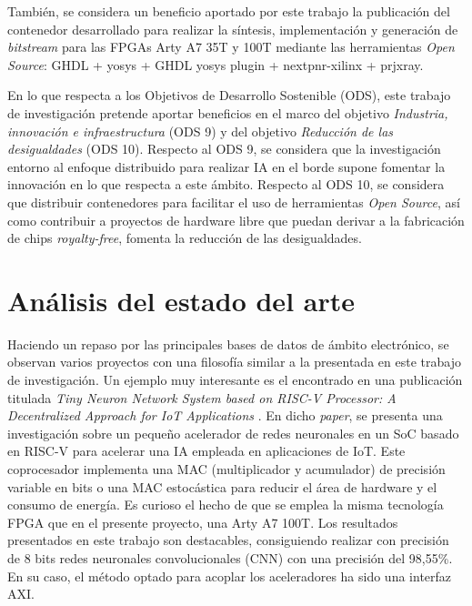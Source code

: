 También, se considera un beneficio aportado por este trabajo la publicación del contenedor \cite{gh:conatiner-implarty} desarrollado para realizar la síntesis, implementación y generación de \textit{bitstream} para las FPGAs Arty A7 35T y 100T mediante las herramientas \textit{Open Source}: GHDL + yosys + GHDL yosys plugin + nextpnr-xilinx + prjxray.

En lo que respecta a los Objetivos de Desarrollo Sostenible (ODS), este trabajo de investigación pretende aportar beneficios en el marco del objetivo \textit{Industria, innovación e infraestructura} (ODS 9) y del objetivo \textit{Reducción de las desigualdades} (ODS 10). 
Respecto al ODS 9, se considera que la investigación entorno al enfoque distribuido para realizar IA en el borde supone fomentar la innovación en lo que respecta a este ámbito.
Respecto al ODS 10, se considera que distribuir contenedores para facilitar el uso de herramientas \textit{Open Source}, así como contribuir a proyectos de hardware libre que puedan derivar a la fabricación de chips \textit{royalty-free}, fomenta la reducción de las desigualdades.

\section{Análisis del estado del arte}

Haciendo un repaso por las principales bases de datos de ámbito electrónico, se observan varios proyectos con una filosofía similar a la presentada en este trabajo de investigación.
Un ejemplo muy interesante es el encontrado en una publicación titulada \textit{Tiny Neuron Network System based on RISC-V Processor: A Decentralized Approach for IoT Applications} \cite{9942990}.
En dicho \textit{paper}, se presenta una investigación sobre un pequeño acelerador de redes neuronales en un SoC basado en RISC-V para acelerar una IA empleada en aplicaciones de IoT. 
Este coprocesador implementa una MAC (multiplicador y acumulador) de precisión variable en bits o una MAC estocástica para reducir el área de hardware y el consumo de energía. 
Es curioso el hecho de que se emplea la misma tecnología FPGA que en el presente proyecto, una Arty A7 100T.
Los resultados presentados en este trabajo son destacables, consiguiendo realizar con precisión de 8 bits redes neuronales convolucionales (CNN) con una precisión del 98,55\%.
En su caso, el método optado para acoplar los aceleradores ha sido una interfaz AXI.

